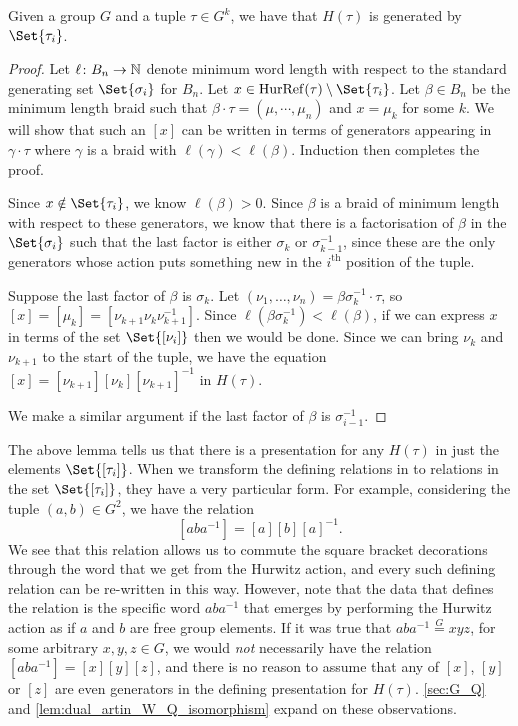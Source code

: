 \begin{lemma}
	\label{lem:hurwitz_group_generators}
	Given a group $G$ and a tuple $\tau \in G^k$, we have that $H(\tau)$ is generated by $\Set{\tau_i}$.
\end{lemma}
\begin{proof}
	Let $\ell \colon B_n \to \mathbb{N}$ denote minimum word length with respect to the standard generating set $\Set{\sigma_i} $ for $B_n$.
	Let $x \in \hurref(\tau) \setminus \Set{\tau_i}$.
	Let $\beta \in B_n$ be the minimum length braid such that $\beta \cdot \tau =(\mu,\cdots,\mu_n)$ and $x=\mu_k$ for some $k$.
	We will show that such an $[x]$ can be written in terms of generators appearing in $\gamma \cdot \tau$ where  $\gamma$ is a braid with $\ell(\gamma)<\ell(\beta)$.
	Induction then completes the proof.

	Since $x \notin \Set{\tau_i}$, we know $\ell(\beta)>0$.
	Since $\beta$ is a braid of minimum length with respect to these generators, we know that there is a factorisation of $\beta$ in the $\Set{\sigma_i} $ such that the last factor is either $\sigma_k$ or  $\sigma_{k-1}^{-1}$, since these are the only generators whose action puts something new in the $i^{\text{th}}$ position of the tuple.

	Suppose the last factor of $\beta$ is $\sigma_k$.
	Let $(\nu_1,\ldots,\nu_n) = \beta\sigma_k^{-1} \cdot \tau$, so $[x] = [\mu_k] = [\nu_{k+1}\nu_k\nu_{k+1}^{-1}]$.
	Since $\ell(\beta \sigma_k^{-1}) < \ell(\beta)$, if we can express $x$ in terms of the set $\Set{[\nu_i]}$ then we would be done.
	Since we can bring $\nu_k$ and  $\nu_{k+1}$ to the start of the tuple, we have the equation $[x]=[\nu_{k+1}][\nu_k][\nu_{k+1}]^{-1}$ in $H(\tau)$.

	We make a similar argument if the last factor of $\beta$ is  $\sigma_{i-1}^{-1}$.
\end{proof}

\begin{remark}
	\label{rmk:relations_in_hurwitz_group}
	The above lemma tells us that there is a presentation for any $H(\tau)$ in just the elements $\Set{[\tau_i]} $.
	When we transform the defining relations in to relations in the set $\Set{[\tau_i]} $, they have a very particular form.
	For example, considering the tuple $(a,b) \in G^2$, we have the relation
	\[
		[aba^{-1}]=[a][b][a]^{-1}
		.\]
	We see that this relation allows us to commute the square bracket decorations through the word that we get from the Hurwitz action, and every such defining relation can be re-written in this way.
	However, note that the data that defines the relation is the specific word $aba^{-1}$ that emerges by performing the Hurwitz action as if $a$ and $b$ are free group elements.
	If it was true that $aba^{-1} \stackrel{G}{=} xyz$, for some arbitrary $x,y,z \in G$, we would \emph{not} necessarily have the relation $[aba^{-1}]=[x][y][z]$, and there is no reason to assume that any of $[x]$, $[y]$ or $[z]$ are even generators in the defining presentation for $H(\tau)$.
	\cref{sec:G_Q} and \cref{lem:dual_artin_W_Q_isomorphism} expand on these observations.
\end{remark}

